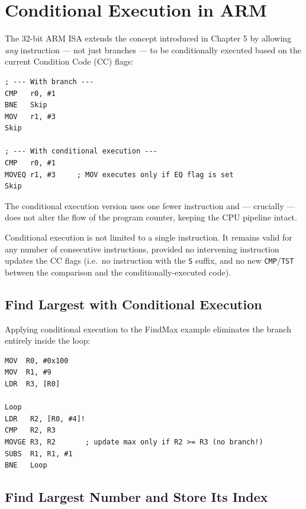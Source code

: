 \documentclass[11pt, a4paper, notitlepage]{report}
\theoremstyle{definition}
\theoremstyle{remark}
\theoremstyle{definition}
\begin{document}
\section{Conditional Execution in ARM}

The 32-bit ARM ISA extends the concept introduced in Chapter 5 by allowing \emph{any} instruction --- not just branches --- to be conditionally executed based on the current Condition Code (CC) flags:

\begin{lstlisting}
; --- With branch ---
CMP   r0, #1
BNE   Skip
MOV   r1, #3
Skip

; --- With conditional execution ---
CMP   r0, #1
MOVEQ r1, #3     ; MOV executes only if EQ flag is set
Skip
\end{lstlisting}

The conditional execution version uses one fewer instruction and --- crucially --- does not alter the flow of the program counter, keeping the CPU pipeline intact.

\begin{examtip}[title={Conditional Execution Across Multiple Instructions}]
Conditional execution is not limited to a single instruction. It remains valid for any number of consecutive instructions, provided no intervening instruction updates the CC flags (i.e.\ no instruction with the \texttt{S} suffix, and no new \texttt{CMP}/\texttt{TST} between the comparison and the conditionally-executed code).
\end{examtip}

\subsection{Find Largest with Conditional Execution}

Applying conditional execution to the FindMax example eliminates the branch entirely inside the loop:

\begin{lstlisting}
MOV  R0, #0x100
MOV  R1, #9
LDR  R3, [R0]

Loop
LDR   R2, [R0, #4]!
CMP   R2, R3
MOVGE R3, R2       ; update max only if R2 >= R3 (no branch!)
SUBS  R1, R1, #1
BNE   Loop
\end{lstlisting}

\subsection{Find Largest Number and Store Its Index}
\end{document}
